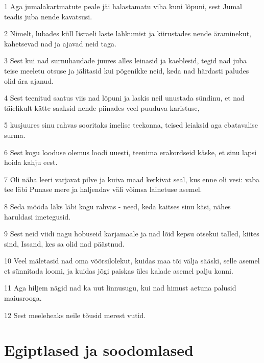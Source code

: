 \par 1 Aga jumalakartmatute peale jäi halastamatu viha kuni lõpuni, sest Jumal teadis juba nende kavatsusi.
\par 2 Nimelt, lubades küll Iisraeli laste lahkumist ja kiirustades nende äraminekut, kahetsevad nad ja ajavad neid taga.
\par 3 Sest kui nad surnuhaudade juures alles leinasid ja kaeblesid, tegid nad juba teise meeletu otsuse ja jälitasid kui põgenikke neid, keda nad härdasti paludes olid ära ajanud.
\par 4 Sest teenitud saatus viis nad lõpuni ja laskis neil unustada sündinu, et nad täielikult kätte saaksid nende piinades veel puuduva karistuse,
\par 5 kusjuures sinu rahvas sooritaks imelise teekonna, teised leiaksid aga ebatavalise surma.
\par 6 Sest kogu looduse olemus loodi uuesti, teenima erakordseid käske, et sinu lapsi hoida kahju eest.
\par 7 Oli näha leeri varjavat pilve ja kuiva maad kerkivat seal, kus enne oli vesi: vaba tee läbi Punase mere ja haljendav väli võimsa lainetuse asemel.
\par 8 Seda mööda läks läbi kogu rahvas - need, keda kaitses sinu käsi, nähes haruldasi imetegusid.
\par 9 Sest neid viidi nagu hobuseid karjamaale ja nad lõid kepsu otsekui talled, kiites sind, Issand, kes sa olid nad päästnud.
\par 10 Veel mäletasid nad oma võõrsilolekut, kuidas maa tõi välja sääski, selle asemel et sünnitada loomi, ja kuidas jõgi paiskas üles kalade asemel palju konni.
\par 11 Aga hiljem nägid nad ka uut linnusugu, kui nad himust aetuna palusid maiusrooga.
\par 12 Sest meeleheaks neile tõusid merest vutid. 

\section*{Egiptlased ja soodomlased}

